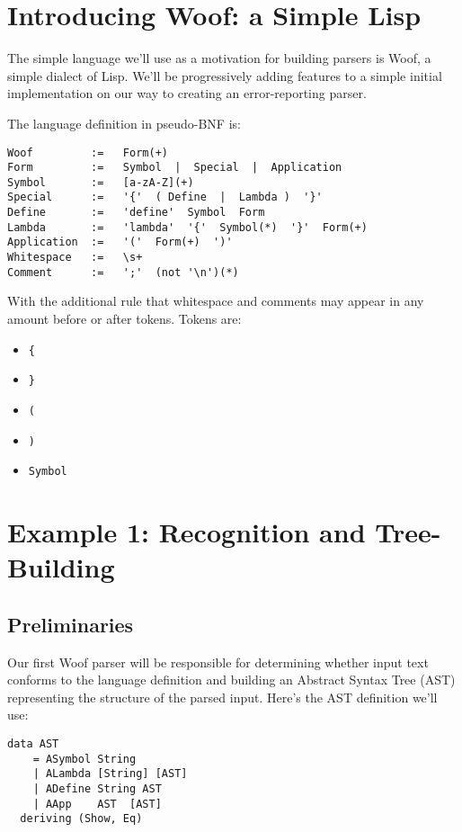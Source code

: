 \documentclass{tmr}
\begin{document}
\section{Introducing Woof:  a Simple Lisp}


The simple language we'll use as a motivation for building parsers is Woof, a 
simple dialect of Lisp.  We'll be progressively adding features to a simple 
initial implementation on our way to creating an error-reporting parser.

The language definition in pseudo-BNF \cite{bnf} is:

\begin{verbatim}
Woof         :=   Form(+)
Form         :=   Symbol  |  Special  |  Application
Symbol       :=   [a-zA-Z](+)
Special      :=   '{'  ( Define  |  Lambda )  '}'
Define       :=   'define'  Symbol  Form
Lambda       :=   'lambda'  '{'  Symbol(*)  '}'  Form(+)
Application  :=   '('  Form(+)  ')'
Whitespace   :=   \s+
Comment      :=   ';'  (not '\n')(*)
\end{verbatim}

With the additional rule that whitespace and comments may appear in any 
amount before or after tokens.  Tokens are:
\begin{itemize}
  \item \verb+{+
  \item \verb+}+
  \item \verb+(+
  \item \verb+)+
  \item \verb+Symbol+
\end{itemize}




\section{Example 1: Recognition and Tree-Building}

\subsection{Preliminaries}
Our first Woof parser will be responsible for determining whether input
text conforms to the language definition and building an 
Abstract Syntax Tree (AST) representing the structure of the parsed input.
Here's the AST definition we'll use:
\begin{verbatim}
data AST
    = ASymbol String
    | ALambda [String] [AST]
    | ADefine String AST
    | AApp    AST  [AST]
  deriving (Show, Eq)
\end{verbatim}
\end{document}
